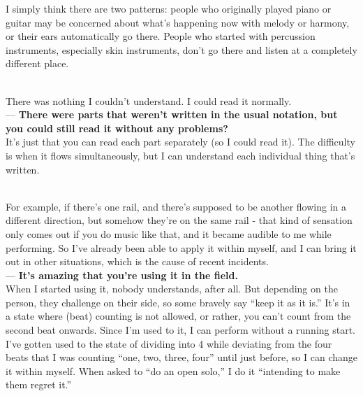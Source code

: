 \begin{description}
I simply think there are two patterns: people who originally played piano or guitar may be concerned about what's happening now with melody or harmony, or their ears automatically go there. People who started with percussion instruments, especially skin instruments, don't go there and listen at a completely different place.

\item [About the work's booklet, could you understand the content?]\mbox{}\\

There was nothing I couldn't understand. I could read it normally.\\

--- {\bf There were parts that weren't written in the usual notation, but you could still read it without any problems?}\\

It's just that you can read each part separately (so I could read it). The difficulty is when it flows simultaneously, but I can understand each individual thing that's written.\\

\item [About the booklet, were there any impressions or useful insights for you?]\mbox{}\\

For example, if there's one rail, and there's supposed to be another flowing in a different direction, but somehow they're on the same rail - that kind of sensation only comes out if you do music like that, and it became audible to me while performing. So I've already been able to apply it within myself, and I can bring it out in other situations, which is the cause of recent incidents.\\

--- {\bf It's amazing that you're using it in the field.}\\

When I started using it, nobody understands, after all. But depending on the person, they challenge on their side, so some bravely say ``keep it as it is.'' It's in a state where (beat) counting is not allowed, or rather, you can't count from the second beat onwards. Since I'm used to it, I can perform without a running start. I've gotten used to the state of dividing into 4 while deviating from the four beats that I was counting ``one, two, three, four'' until just before, so I can change it within myself. When asked to ``do an open solo,'' I do it ``intending to make them regret it.''\\


\end{description}
